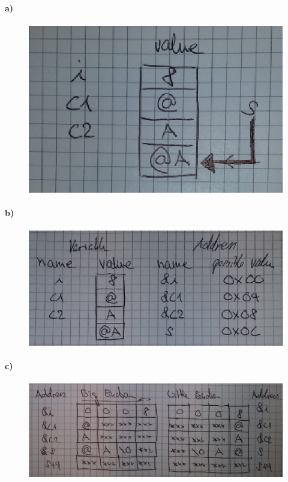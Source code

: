 \documentclass[12pt]{article}
\begin{document}
\paragraph*{a)}
\quad
\begin{figure}[!htb]
\centering
\includegraphics[scale=0.5]{mem_a.eps} 
\end{figure}

\paragraph*{b)}
\quad
\begin{figure}[!htb]
\centering
\includegraphics[scale=0.6]{mem_b.eps} 
\end{figure}

\paragraph*{c)}
\quad
\begin{figure}[!htb]
\centering
\includegraphics[scale=0.75]{mem_c.eps} 
\end{figure}
\end{document}
